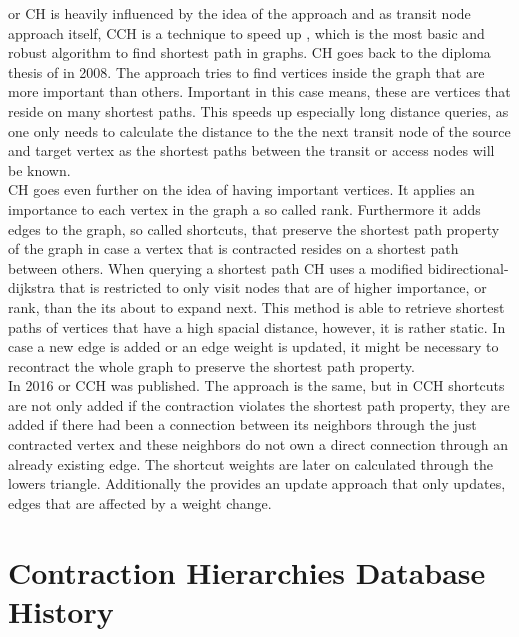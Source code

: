 \cite[Contraction Hierarchies]{Geisberger_2012} or CH is heavily influenced by the idea of the \cite[Transit-Node]{Bast_2007} approach and as transit node approach itself, CCH is a
technique to speed up \cite[Dijkstras Algorithm]{Dijkstra_1959}, which is the most basic and robust algorithm to find shortest path in graphs. CH goes back to the diploma thesis of \cite[Geisberger]{Geisberger} in 2008. The \cite[Transit-Node]{Bast_2007} approach
tries to find vertices inside the graph that are more important than others. Important in this case means, these are vertices that reside on many shortest paths. This speeds up 
especially long distance queries, as one only needs to calculate the distance to the the next transit node of the source and target vertex as the shortest paths between 
the transit or access nodes will be known. \\ 
CH goes even further on the idea of having important vertices. It applies an importance to each vertex in the graph a so called rank. Furthermore it adds edges to the graph,
so called shortcuts, that preserve the shortest path property of the graph in case a vertex that is contracted resides on a shortest path between others. When querying a shortest
path CH uses a modified bidirectional-dijkstra that is restricted to only visit nodes that are of higher importance, or rank, than the its about to expand next.
This method is able to retrieve shortest paths of vertices that have a high spacial distance, however, it is rather static. In case a new edge is added or an edge weight is updated, 
it might be necessary to recontract the whole graph to preserve the shortest path property. \\
In 2016 \cite[Customization Contraction Hierarchies]{CCH} or CCH was published. The approach is the same, but in CCH shortcuts are not only added if the contraction violates the shortest path property,
they are added if there had been a connection between its neighbors through the just contracted vertex and these neighbors do not own a direct connection through an already existing edge.
The shortcut weights are later on calculated through the lowers triangle. Additionally the \cite[Customization Contraction Hierarchies]{CCH} provides an update approach that only updates,
edges that are affected by a weight change.

\section{Contraction Hierarchies Database History}\label{sec:related_work:database}

